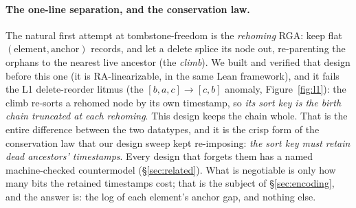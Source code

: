 \documentclass[11pt]{article}
\begin{document}
\paragraph{The one-line separation, and the conservation law.} The
natural first attempt at tombstone-freedom is the \emph{rehoming}
RGA: keep flat $(\mathrm{element}, \mathrm{anchor})$ records, and let
a delete splice its node out, re-parenting the orphans to the nearest
live ancestor (the \emph{climb}). We built and verified that design
before this one (it is RA-linearizable, in the same Lean framework),
and it fails the L1 delete-reorder litmus
(the $[b,a,c] \to [c,b]$ anomaly, Figure~\ref{fig:l1}): the climb
re-sorts a rehomed node by its own timestamp, so \emph{its sort key
is the birth chain truncated at each rehoming}. This design keeps the
chain whole. That is the entire difference
between the two datatypes,
and it is the crisp form of the conservation law that our design
sweep kept re-imposing:
\emph{the sort key must retain dead ancestors' timestamps}. Every
design that forgets them has a named machine-checked countermodel
(\S\ref{sec:related}). What is negotiable is only how many bits the
retained timestamps cost; that is the subject of
\S\ref{sec:encoding}, and the answer is: the log of each element's
anchor gap, and nothing else.
\end{document}

